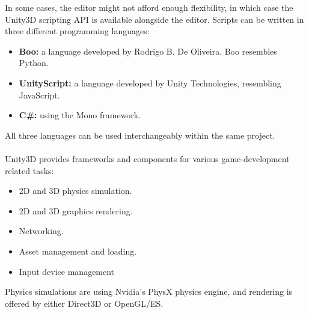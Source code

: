 In some cases, the editor might not afford enough flexibility, in which case
the Unity3D scripting API is available alongside the editor.
Scripts can be written in three different programming languages:

\begin{itemize}
    \item \textbf{Boo:} a language developed by Rodrigo B. De Oliveira. Boo resembles Python.
    \item \textbf{UnityScript:} a language developed by Unity
        Technologies, resembling JavaScript.
    \item \textbf{C\#:} using the Mono framework.
\end{itemize}

All three languages can be used interchangeably within the same project.
\\
\\
Unity3D provides frameworks and components for various game-development related
tasks:
\begin{itemize}
    \item 2D and 3D physics simulation.
    \item 2D and 3D graphics rendering.
    \item Networking.
    \item Asset management and loading.
    \item Input device management
\end{itemize}

Physics simulations are using Nvidia's PhysX physics engine\cite{unityengineoverview}, and rendering is
offered by either Direct3D or OpenGL/ES.


